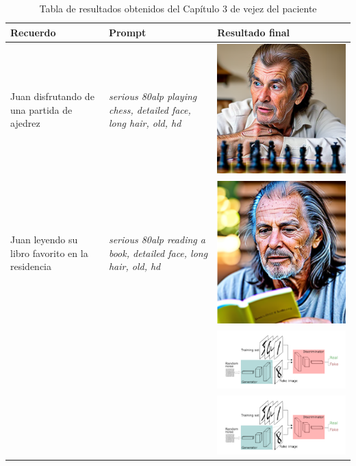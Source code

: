 \begin{table}
	\centering
	\begin{tabular}{>{\centering\arraybackslash}m{5cm} >{\arraybackslash}m{5cm}>{\arraybackslash}m{5cm}}
		\textbf{Recuerdo} & \textbf{Prompt} & \textbf{Resultado final} \\
		\hline
		Juan disfrutando de una partida de ajedrez & \textit{serious 80alp playing chess, detailed face, long hair, old, hd} & \includegraphics[width = 0.3
		\textwidth]{Imagenes/Vectorial/80alpchess.png}\\
		\hline
		 Juan leyendo su libro favorito en la residencia & \textit{serious 80alp reading a book, detailed face, long hair, old, hd} & \includegraphics[width = 0.3
		\textwidth]{Imagenes/Vectorial/80alpbook.png}\\
		\hline
		& & \includegraphics[width = 0.3
		\textwidth]{Imagenes/Vectorial/gan.png}\\
		\hline
		&  & \includegraphics[width = 0.3
		\textwidth]{Imagenes/Vectorial/gan.png}\\
		\hline
	\end{tabular}
	\caption{Tabla de resultados obtenidos del Capítulo 3 de vejez del paciente}
	\label{tab:capitulo3librovida}
\end{table}


